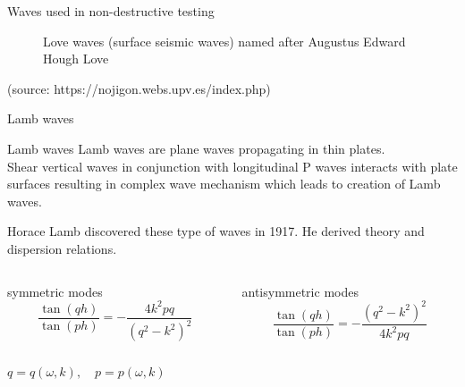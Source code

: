 \documentclass[10pt,aspectratio=169,dvipsnames]{beamer} %
\begin{document}
\setcounter{subfigure}{0}
\begin{frame}{Waves used in non-destructive testing}
	\begin{figure}			
		\centering
		\caption{\alert{Love waves} (surface seismic waves) named after Augustus Edward Hough Love}		
	\end{figure}			
\tiny 
(source: https://nojigon.webs.upv.es/index.php)
\end{frame}
\setcounter{subfigure}{0}
\begin{frame}{Lamb waves}
	\begin{alertblock}{Lamb waves}	
		Lamb waves are plane waves propagating in thin plates.\\
		Shear vertical waves in conjunction with longitudinal P waves interacts with plate surfaces resulting in complex wave mechanism which leads to creation of Lamb waves.
	\end{alertblock}
	Horace Lamb discovered these type of waves in 1917.
	He derived theory and dispersion relations.
	\begin{columns}[T]
		\begin{column}{0.5\textwidth}
			\centering
			symmetric modes
			\begin{equation*}
				\frac{\tan(q h)}{\tan(p h)} = -\frac{4 k^2 p q}{\left(q^2 - k^2\right)^2}
			\end{equation*}
		\end{column}
		\begin{column}{0.5\textwidth}
			\centering
			antisymmetric modes
			\begin{equation*}
				\frac{\tan(q h)}{\tan(p h)} = -\frac{\left(q^2 - k^2\right)^2}{4 k^2 p q}
			\end{equation*}
		\end{column}	
	\end{columns}	
	\centering
	\(q=q(\omega,k), \quad p=p(\omega,k) \)
\end{frame}
\setcounter{subfigure}{0}
\end{document}
